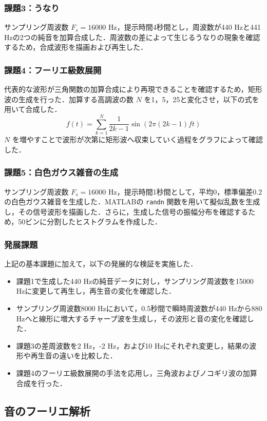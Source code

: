 \documentclass[paper=a4, fontsize=10pt]{jlreq}
\begin{document}
\subsubsection{課題3：うなり}
サンプリング周波数 $F_s = 16000$ Hz，提示時間4秒間とし，周波数が440 Hzと441 Hzの2つの純音を加算合成した．周波数の差によって生じるうなりの現象を確認するため，合成波形を描画および再生した．

\subsubsection{課題4：フーリエ級数展開}
代表的な波形が三角関数の加算合成により再現できることを確認するため，矩形波の生成を行った．加算する高調波の数 $N$ を1，5，25と変化させ，以下の式を用いて合成した．
$$f(t)=\sum_{k=1}^{N}\frac{1}{2k-1}\sin(2\pi(2k-1)ft)$$
$N$ を増やすことで波形が次第に矩形波へ収束していく過程をグラフによって確認した．

\subsubsection{課題5：白色ガウス雑音の生成}
サンプリング周波数 $F_s = 16000$ Hz，提示時間1秒間として，平均0，標準偏差0.2の白色ガウス雑音を生成した．MATLABの \texttt{randn} 関数を用いて擬似乱数を生成し，その信号波形を描画した．さらに，生成した信号の振幅分布を確認するため，50ビンに分割したヒストグラムを作成した．

\subsubsection{発展課題}
上記の基本課題に加えて，以下の発展的な検証を実施した．
\begin{itemize}
    \item 課題1で生成した440 Hzの純音データに対し，サンプリング周波数を15000 Hzに変更して再生し，再生音の変化を確認した．
    \item サンプリング周波数8000 Hzにおいて，0.5秒間で瞬時周波数が440 Hzから880 Hzへと線形に増大するチャープ波を生成し，その波形と音の変化を確認した．
    \item 課題3の差周波数を2 Hz，-2 Hz，および10 Hzにそれぞれ変更し，結果の波形や再生音の違いを比較した．
    \item 課題4のフーリエ級数展開の手法を応用し，三角波およびノコギリ波の加算合成を行った．
\end{itemize}

\subsection{音のフーリエ解析}
\end{document}
